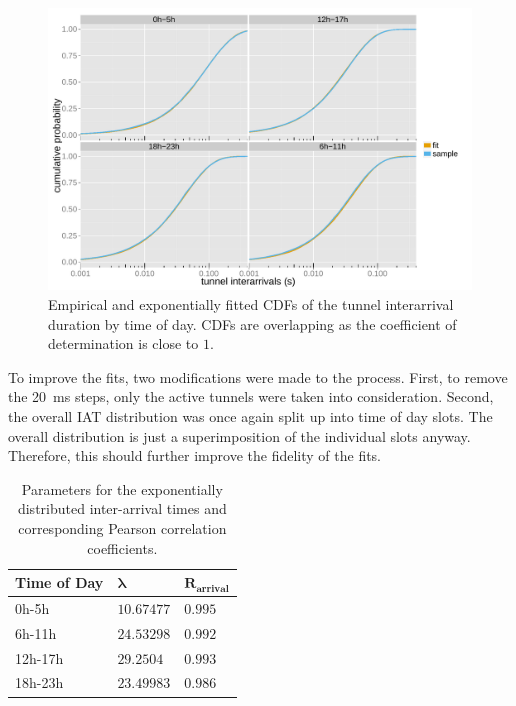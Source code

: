 \begin{figure}[htb]
	\centering
	\includegraphics[width=1.0\textwidth]{images/R-IAT-active-fit-cdf-facets.pdf}
	\caption{Empirical and exponentially fitted \glspl{CDF} of the tunnel interarrival duration by time of day. \glspl{CDF} are overlapping as the coefficient of determination is close to $1$.}
\label{c4:fig:pdparrivalsecdf}
\end{figure}

To improve the fits, two modifications were made to the process. First, to remove the \SI{20}{\milli\second} steps, only the active tunnels were taken into consideration. Second, the overall \gls{IAT} distribution was once again split up into time of day slots. The overall distribution is just a superimposition of the individual slots anyway. Therefore, this should further improve the fidelity of the fits.

\begin{table}[htb]
\caption{Parameters for the exponentially distributed inter-arrival times and corresponding Pearson correlation coefficients.}
\label{c4:tab:IAT-fits}
	\centering
	\begin{tabu}{X[0.9,l]X[r]X[r]} 
	\toprule
	\textbf{Time of Day} & $\mathbf{\lambda}$ & $\mathbf{R_{arrival}}$\\ 
	\midrule
	0h-5h   & $10.67477$ & $0.995$ \\
	6h-11h  & $24.53298$ & $0.992$ \\
	12h-17h & $29.2504$  & $0.993$ \\
	18h-23h & $23.49983$ & $0.986$ \\
	\bottomrule
	\end{tabu}
\end{table}

